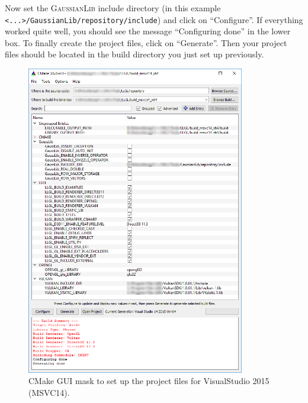 \documentclass{article}
\begin{document}
Now set the \textsc{GaussianLib} include directory (in this example \texttt{<...>/GaussianLib/repository/include})
and click on ``Configure''. If everything worked quite well, you should see the message ``Configuring done''
in the lower box. To finally create the project files, click on ``Generate''.
Then your project files should be located in the build directory you just set up previously.

\begin{figure}[ht]
	\centering
	\includegraphics[width=0.85\textwidth]{cmake_mask1}
	\caption{CMake GUI mask to set up the project files for VisualStudio 2015 (MSVC14).}
	\label{fig:cmake_mask1}
\end{figure}
\end{document}
